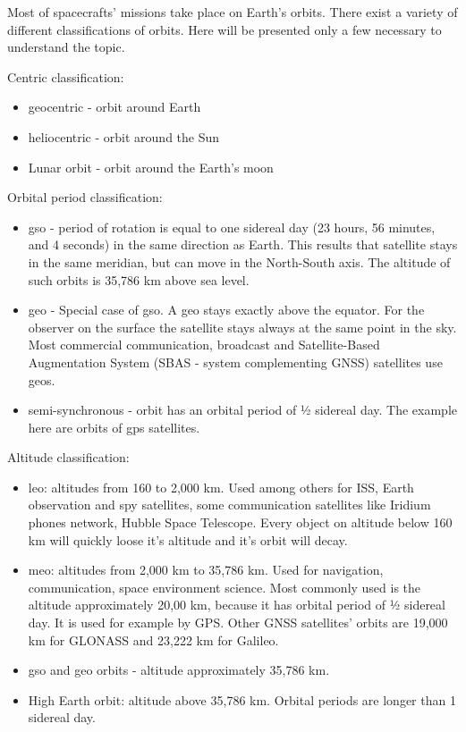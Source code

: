 \documentclass[12pt,a4paper,oneside]{article}
\begin{document}
Most of spacecrafts' missions take place on Earth's orbits. There exist a variety of different classifications of orbits. Here will be presented only a few necessary to understand the topic.

Centric classification:

\begin{itemize}
\item geocentric - orbit around Earth
\item heliocentric - orbit around the Sun
\item Lunar orbit - orbit around the Earth's moon
\end{itemize}

Orbital period classification:

\begin{itemize}
\item \gls{gso} - period of rotation is equal to one sidereal day (23 hours, 56 minutes, and 4 seconds) in the same direction as Earth. This results that satellite stays in the same meridian, but can move in the North-South axis. The altitude of such orbits is 35,786 km above sea level.
\item \gls{geo} - Special case of \gls{gso}. A \gls{geo} stays exactly above the equator. For the observer on the surface the satellite stays always at the same point in the sky. Most commercial communication, broadcast and Satellite-Based Augmentation System (SBAS - system complementing GNSS) satellites use \gls{geo}s.
\item semi-synchronous - orbit has an orbital period of ½ sidereal day. The example here are orbits of \gls{gps} satellites.
\end{itemize}
\pagebreak
Altitude classification: 

\begin{itemize}
\item \gls{leo}: altitudes from 160 to 2,000 km. Used among others for ISS, Earth observation and spy satellites, some communication satellites like Iridium phones network, Hubble Space Telescope. Every object on altitude below 160 km will quickly loose it's altitude and it's orbit will decay.
\item \gls{meo}: altitudes from 2,000 km to 35,786 km. Used for navigation, communication, space environment science. Most commonly used is the altitude approximately 20,00 km, because it has orbital period of ½ sidereal day. It is used for example by GPS. Other GNSS satellites' orbits are 19,000 km for GLONASS and 23,222 km for Galileo.
\item \gls{gso} and \gls{geo} orbits - altitude approximately 35,786 km.
\item High Earth orbit: altitude above 35,786 km. Orbital periods are longer than 1 sidereal day.

\end{itemize}
\end{document}

